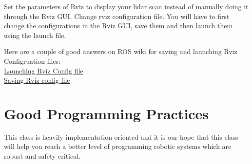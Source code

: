 \documentclass[letta4 paper]{article}
\numberwithin{equation}{section}
\newcommand{\0}{\mathbf{0}}
\begin{document}
	Set the parameters of Rviz to display your lidar scan instead of manually doing it through the Rviz GUI. Change rviz configuration file. You will have to first change the configurations in the Rviz GUI, save them and then launch them using the launch file.
	
	Here are a couple of good answers on ROS wiki for saving and launching Rviz Configruation files: \\
	\href{https://answers.ros.org/question/287670/run-rviz-with-configuration-file-from-launch-file/}{Launching Rviz Config file}\\
	\href{https://answers.ros.org/question/11845/rviz-configuration-file-format/}{Saving Rviz config file}\\

	\section{Good Programming Practices}
	This class is heavily implementation oriented and it is our hope that this class will help you reach a better level of programming robotic systems which are robust and safety critical. 
\end{document}
